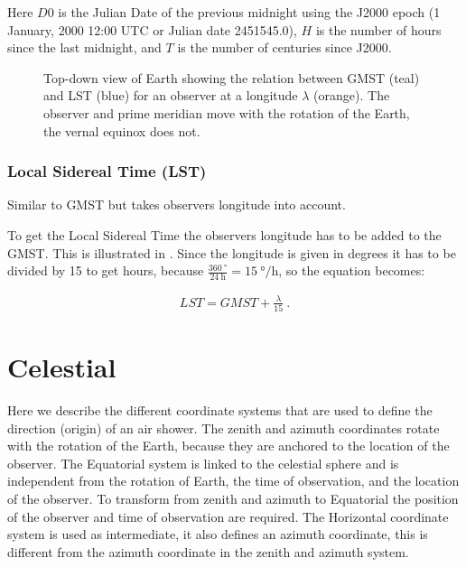Here $D0$ is the Julian Date of the previous midnight using the J2000
epoch (1 January, 2000 12:00 UTC or Julian date 2451545.0), $H$ is the
number of hours since the last midnight, and $T$ is the number of
centuries since J2000.

\begin{figure}
    \centering
    
    \caption{Top-down view of Earth showing the relation between GMST
             (teal) and LST (blue) for an observer at a longitude
             $\lambda$ (orange). The observer and prime meridian move with
             the rotation of the Earth, the vernal equinox does not.}
    \label{fig:wgs84_gmst_lst}
\end{figure}


\subsubsection{Local Sidereal Time (LST)}

Similar to GMST but takes observers longitude into account.

To get the Local Sidereal Time the observers longitude has to be added
to the GMST. This is illustrated in . Since
the longitude is given in degrees it has to be divided by 15 to get
hours, because $\frac{\SI{360}{\degree}}{\SI{24}{\hour}} =
\SI{15}{\degree\per\hour}$, so the equation becomes:

\begin{equation}
    \begin{array}{l}
        \mathit{LST} = \mathit{GMST} + \frac{\lambda}{15} \ .
    \end{array}
\end{equation}


\section{Celestial}
\label{sec:celestial}

Here we describe the different coordinate systems that are used to
define the direction (origin) of an air shower. The zenith and azimuth
coordinates rotate with the rotation of the Earth, because they are
anchored to the location of the observer. The Equatorial system is
linked to the celestial sphere and is independent from the rotation of
Earth, the time of observation, and the location of the observer. To
transform from zenith and azimuth to Equatorial the position of the
observer and time of observation are required. The Horizontal coordinate
system is used as intermediate, it also defines an azimuth coordinate,
this is different from the azimuth coordinate in the zenith and azimuth
system.


